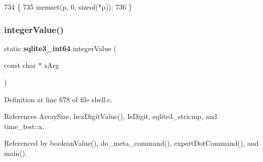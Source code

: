 \begin{DoxyCode}
734                                   \{
735   memset(p, 0, \textcolor{keyword}{sizeof}(*p));
736 \}
\end{DoxyCode}
\mbox{\label{shell_8c_a6b013248ac88dba54baa5a29cbe85347}} 
\subsubsection{integer\+Value()}
{\footnotesize\ttfamily static \textbf{ sqlite3\+\_\+int64} integer\+Value (\begin{DoxyParamCaption}\item[{const char $\ast$}]{z\+Arg }\end{DoxyParamCaption})\hspace{0.3cm}{\ttfamily [static]}}



Definition at line 678 of file shell.\+c.



References Array\+Size, hex\+Digit\+Value(), Is\+Digit, sqlite3\+\_\+stricmp, and time\+\_\+test\+::x.



Referenced by boolean\+Value(), do\+\_\+meta\+\_\+command(), expert\+Dot\+Command(), and main().


